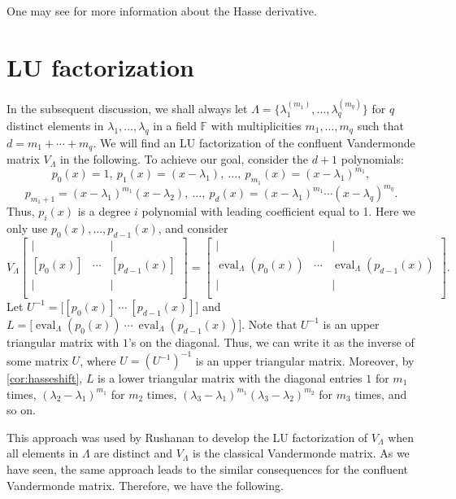 \documentclass{article}
\theoremstyle{definition}
\newcommand{\eval}{\operatorname{eval}}
\begin{document}
One may see \cite{Goldschmidt03} for  more  information about the Hasse derivative.


\section{LU factorization}

In the subsequent discussion, we shall always 
let $\Lambda = \{\lambda_1^{(m_1)}, \ldots, \lambda_q^{(m_q)}\}$ 
for $q$ distinct elements in $\lambda_1, \dots, \lambda_q$ in a field ${\mathbb F}$
with multiplicities $m_1, \dots, m_q$ such that
$d = m_1 + \cdots + m_q$.  
We will find an LU factorization of the confluent Vandermonde matrix 
$V_\Lambda$ in the following.
To achieve our goal, consider the $d+1$ polynomials:
$$p_0(x) = 1,\  p_1(x) = (x - \lambda_1), \ \ldots,  
\ p_{m_1}(x) = (x - \lambda_1)^{m_1}, $$
$$p_{m_1+1} = (x-\lambda_1)^{m_1}(x - \lambda_2), \ \dots, \ p_{d}(x) 
= (x-\lambda_1)^{m_1} \cdots (x-\lambda_q)^{m_q}.$$ 
Thus, $p_i(x)$ is a degree $i$ polynomial with leading coefficient equal to 1.
Here we  only use $p_0(x), \dots, p_{d-1}(x)$, and consider 
\begin{equation}
\label{eq:lu}
    V_\Lambda
    \begin{bmatrix}
        | & ~ & | \\
        [p_0(x)] & \cdots & [p_{d-1}(x)] \\
        | & ~ & | \\
    \end{bmatrix} = 
    \begin{bmatrix}
        | & ~ & | \\
        \eval_\Lambda(p_0(x)) & \cdots & \eval_\Lambda(p_{d-1}(x)) \\
        | & ~ & | \\
    \end{bmatrix}.
\end{equation}
Let $U^{-1} = \Big[ [p_0(x)] \ \cdots \ [p_{d-1}(x)] \Big]$ and 
$L =  \Big[ \eval_\Lambda(p_0(x)) \ \cdots \ \eval_\Lambda(p_{d-1}(x))\Big]$.
Note that $U^{-1}$ is an upper triangular matrix with $1$'s on the diagonal. 
Thus, we can write it as the inverse of some matrix $U$, where $U = (U^{-1})^{-1}$ is an upper triangular matrix.  
Moreover, by \cref{cor:hasseshift}, $L$ is a lower triangular matrix with the diagonal entries $1$ for $m_1$ 
times, $(\lambda_2 - \lambda_1)^{m_1}$ for $m_2$ times, $(\lambda_3 - \lambda_1)^{m_1}(\lambda_3 - \lambda_2)^{m_2}$ 
for $m_3$ times, and so on.

This approach was used by Rushanan\cite{Rushanan89} to develop the LU factorization of $V_\Lambda$ when all elements in $\Lambda$ are distinct and $V_\Lambda$ is the classical Vandermonde matrix.  As we have seen, the same approach leads to the similar consequences for the confluent Vandermonde matrix.  Therefore, we have the following.
\end{document}
